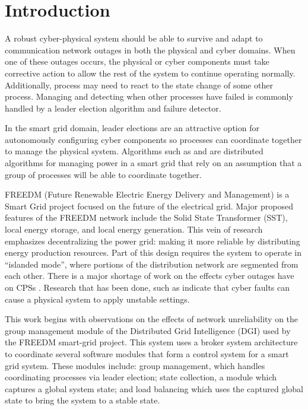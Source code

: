 \chapter{Introduction}
A robust cyber-physical system should be able to survive and adapt to communication network outages in both the physical and cyber domains.
When one of these outages occurs, the physical or cyber components must take corrective action to allow the rest of the system to continue operating normally.
Additionally, process may need to react to the state change of some other process.
Managing and detecting when other processes have failed is commonly handled by a leader election algorithm and failure detector.

In the smart grid domain, leader elections are an attractive option for autonomously configuring cyber components so processes can coordinate together to manage the physical system.
Algorithms such as \cite{LOADBALANCING} and \cite{INCREMENTALCONSENSUS} are distributed algorithms for managing power in a smart grid that rely on an assumption that a group of processes will be able to coordinate together. 

FREEDM (Future Renewable Electric Energy Delivery and Management) is a Smart Grid project focused on the future of the electrical grid.
Major proposed features of the FREEDM network include the Solid State Transformer (SST), local energy storage, and local energy generation\cite{FREEDMMIGRATION}.
This vein of research emphasizes decentralizing the power grid: making it more reliable by distributing energy production resources.
Part of this design requires the system to operate in ``islanded mode'', where portions of the distribution network are segmented from each other.
There is a major shortage of work on the effects cyber outages have on CPSs \cite{CYBERRESEARCHCALL} \cite{SMARTGRIDBENEFITS}.
Research that has been done, such as \cite{HARINI} indicate that cyber faults can cause a physical system to apply unstable settings.

This work begins with observations on the effects of network unreliability on the group management module of the Distributed Grid Intelligence (DGI) used by the FREEDM smart-grid project.
This system uses a broker system architecture to coordinate several software modules that form a control system for a smart grid system.
These modules include: group management, which handles coordinating processes via leader election; state collection, a module which captures a global system state; and load balancing which uses the captured global state to bring the system to a stable state.

